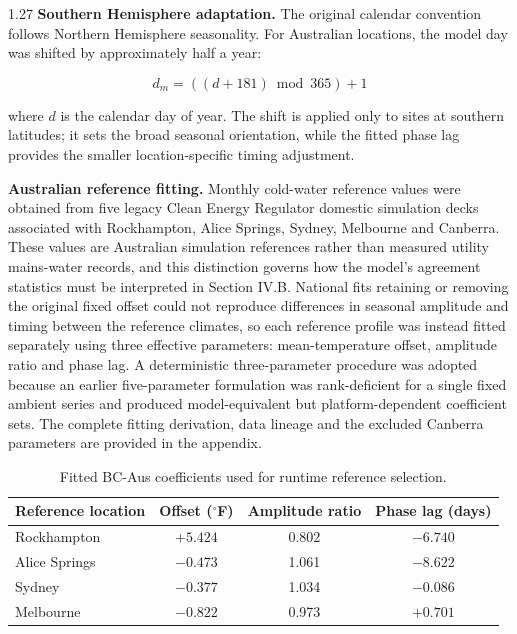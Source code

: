 \documentclass[12pt,letterpaper]{article}
\begin{document}
\begin{spacing}{1.27}
\textbf{Southern Hemisphere adaptation.} The original calendar convention follows Northern Hemisphere seasonality. For Australian locations, the model day was shifted by approximately half a year:

\begin{equation}
d_m = \left(\left(d + 181\right) \bmod 365\right) + 1
\label{eq:daymodel}
\end{equation}

\noindent where $d$ is the calendar day of year. The shift is applied only to sites at southern latitudes; it sets the broad seasonal orientation, while the fitted phase lag provides the smaller location-specific timing adjustment.\par

\vspace{0.15in}

\textbf{Australian reference fitting.} Monthly cold-water reference values were obtained from five legacy Clean Energy Regulator domestic simulation decks associated with Rockhampton, Alice Springs, Sydney, Melbourne and Canberra. These values are Australian simulation references rather than measured utility mains-water records, and this distinction governs how the model's agreement statistics must be interpreted in Section IV.B. National fits retaining or removing the original fixed offset could not reproduce differences in seasonal amplitude and timing between the reference climates, so each reference profile was instead fitted separately using three effective parameters: mean-temperature offset, amplitude ratio and phase lag. A deterministic three-parameter procedure was adopted because an earlier five-parameter formulation was rank-deficient for a single fixed ambient series and produced model-equivalent but platform-dependent coefficient sets. The complete fitting derivation, data lineage and the excluded Canberra parameters are provided in the appendix.
\end{spacing}

\begin{table}[htbp]
\centering
\renewcommand{\thetable}{4}
\begin{tabular}{@{}lccc@{}}
\toprule
\textbf{Reference location} & \textbf{Offset ($^\circ$F)} & \textbf{Amplitude ratio} & \textbf{Phase lag (days)} \\
\midrule
Rockhampton   & $+5.424$ & 0.802 & $-6.740$ \\
Alice Springs & $-0.473$ & 1.061 & $-8.622$ \\
Sydney        & $-0.377$ & 1.034 & $-0.086$ \\
Melbourne     & $-0.822$ & 0.973 & $+0.701$ \\
\bottomrule
\end{tabular}
\caption{Fitted BC-Aus coefficients used for runtime reference selection.}
\label{tab:bcaus-coeffs}
\end{table}
\end{document}

